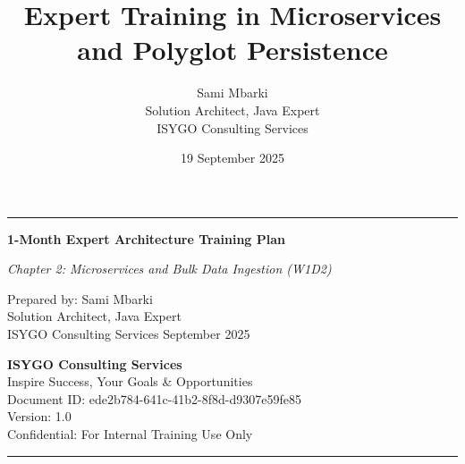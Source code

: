 \documentclass[11pt]{article}
\begin{document}
\begin{titlepage}
    \centering
    \vspace*{1cm}
    \vspace{0.5cm}
    {\color{primaryblue}\hrule height 2pt}
    \vspace{0.5cm}
    {\LARGE\sffamily\bfseries 1-Month Expert Architecture Training Plan\par}
    \vspace{0.3cm}
    {\large\sffamily\itshape Chapter 2: Microservices and Bulk Data Ingestion (W1D2)\par}
    \vspace{1.5cm}
    {\large\sffamily Prepared by: Sami Mbarki \\ Solution Architect, Java Expert \\ ISYGO Consulting Services}
    \vspace{1cm}
    {\large{} September 2025}
    \vfill
    \begin{minipage}{0.8\textwidth}
        \centering
        \small\sffamily \textbf{ISYGO Consulting Services} \\
        \small\sffamily Inspire Success, Your Goals \& Opportunities \\
        \vspace{0.5cm}
        \small\sffamily Document ID: ede2b784-641c-41b2-8f8d-d9307e59fe85 \\
        \small\sffamily Version: 1.0 \\
        \small\sffamily Confidential: For Internal Training Use Only
    \end{minipage}
    {\color{primaryblue}\hrule height 2pt}
\end{titlepage}

\pretitle{\begin{center}\LARGE\sffamily\bfseries}
\posttitle{\end{center}}
\preauthor{\begin{center}\large\sffamily}
\postauthor{\end{center}}
\predate{\begin{center}\large\sffamily}
\postdate{\end{center}}

\pagestyle{fancy}
\title{Expert Training in Microservices and Polyglot Persistence}
\author{Sami Mbarki \\ Solution Architect, Java Expert \\ ISYGO Consulting Services}
\date{19 September 2025}
\maketitle
\end{document}
